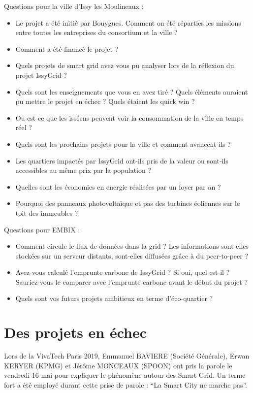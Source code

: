Questions pour la ville d'Issy les Moulineaux :
\begin{itemize}
    \item Le projet a été initié par Bouygues. Comment on été réparties les missions entre toutes les entreprises du
consortium et la ville ?
    \item Comment a été financé le projet ?
    \item Quels projets de smart grid avez vous pu analyser lors de la réflexion du projet IssyGrid ?
    \item Quels sont les enseignements que vous en avez tiré ? Quels éléments auraient pu mettre le projet
en échec ? Quels étaient les quick win ?
    \item Ou est ce que les isséens peuvent voir la consommation de la ville en temps réel ?
    \item Quels sont les prochains projets pour la ville et comment avancent-ils ?
    \item Les quartiers impactés par IssyGrid ont-ils pris de la valeur ou sont-ils accessibles
au même prix par la population ?
    \item Quelles sont les économies en energie réalisées par un foyer par an ?
    \item Pourquoi des panneaux photovoltaïque et pas des turbines éoliennes sur le toit des immeubles ?
\end{itemize}

Questions pour EMBIX :
\begin{itemize}
    \item Comment circule le flux de données dans la grid ? Les informations sont-elles stockées sur un serveur distants,
sont-elles diffusées grâce à du peer-to-peer ?
    \item Avez-vous calculé l'emprunte carbone de IssyGrid ? Si oui, quel est-il ? Sauriez-vous le comparer avec l'emprunte
carbone avant le début du projet ?
    \item Quels sont vos futurs projets ambitieux en terme d'éco-quartier ?
\end{itemize}


\section{Des projets en échec}

Lors de la VivaTech Paris 2019, Emmanuel BAVIERE (Société Générale), Erwan KERYER (KPMG) 
et Jérôme MONCEAUX (SPOON) ont pris la parole le vendredi 16 mai pour expliquer le phénomène autour des 
Smart Grid. Un terme fort a été employé durant cette prise de parole : 
``La Smart City ne marche pas''.

